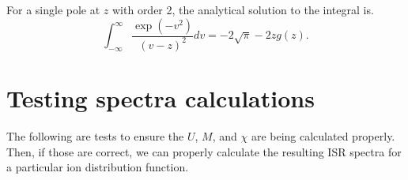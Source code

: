 For a single pole at $z$ with order 2, the analytical solution to the integral is. 
\begin{equation}
	\int_{-\infty}^\infty \frac{ \exp(-v^2) }{(v-z)^2} dv = - 2 \sqrt{\pi} - 2 z g(z).
\end{equation}


\section{Testing spectra calculations}
The following are tests to ensure the $U$, $M$, and $\chi$ are being calculated properly.
Then, if those are correct, we can properly calculate the resulting ISR spectra for a particular ion distribution function.






